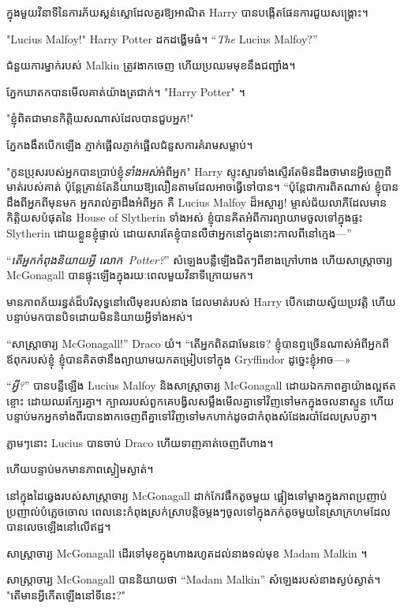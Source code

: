 ក្នុងមួយវិនាទីនៃការភ័យស្លន់ស្លោដែលគួរឱ្យអាណិត Harry បានបង្កើតផែនការជួយសង្គ្រោះ។

"Lucius Malfoy!" Harry Potter ដកដង្ហើមធំ។ “\emph{The} Lucius Malfoy?”

ជំនួយការម្នាក់របស់ Malkin ត្រូវងាកចេញ ហើយប្រឈមមុខនឹងជញ្ជាំង។

ភ្នែកឃាតកបានមើលគាត់យ៉ាងត្រជាក់។ "Harry Potter" ។

"ខ្ញុំពិតជាមានកិត្តិយសណាស់ដែលបានជួបអ្នក!"

ភ្នែក​ងងឹត​បើក​ឡើង ភ្ញាក់ផ្អើល​ភ្ញាក់ផ្អើល​ជំនួស​ការ​គំរាម​សម្លាប់។

"កូនប្រុសរបស់អ្នកបានប្រាប់ខ្ញុំ\emph{ទាំងអស់}អំពីអ្នក" Harry ស្ទុះស្ទារទាំងស្ទើរតែមិនដឹងថាមានអ្វីចេញពីមាត់របស់គាត់ ប៉ុន្តែគ្រាន់តែនិយាយឱ្យលឿនតាមដែលអាចធ្វើទៅបាន។ “ប៉ុន្តែជាការពិតណាស់ ខ្ញុំបានដឹងពីអ្នកពីមុនមក អ្នករាល់គ្នាដឹងអំពីអ្នក គឺ Lucius Malfoy ដ៏អស្ចារ្យ! ម្ចាស់ជ័យលាភីដែលមានកិត្តិយសបំផុតនៃ House of Slytherin ទាំងអស់ ខ្ញុំបានគិតអំពីការព្យាយាមចូលទៅក្នុងផ្ទះ Slytherin ដោយខ្លួនខ្ញុំផ្ទាល់ ដោយសារតែខ្ញុំបានលឺថាអ្នកនៅក្នុងនោះកាលពីនៅក្មេង—”

“\emph{តើអ្នកកំពុងនិយាយអ្វី លោក~Potter?}” សំឡេងបន្លឺឡើងជិតៗពីខាងក្រៅហាង ហើយសាស្រ្តាចារ្យ McGonagall បានផ្ទុះឡើងក្នុងរយៈពេលមួយវិនាទីក្រោយមក។

មានភាពភ័យរន្ធត់ដ៏បរិសុទ្ធនៅលើមុខរបស់នាង ដែលមាត់របស់ Harry បើកដោយស្វ័យប្រវត្តិ ហើយបន្ទាប់មកបានបិទដោយមិននិយាយអ្វីទាំងអស់។

“សាស្រ្តាចារ្យ McGonagall!” Draco យំ។ “តើអ្នកពិតជាមែនទេ? ខ្ញុំ​បាន​ឮ​ច្រើន​ណាស់​អំពី​អ្នក​ពី​ឪពុក​របស់​ខ្ញុំ ខ្ញុំ​បាន​គិត​ថា​នឹង​ព្យាយាម​យក​តម្រៀប​ទៅ​ក្នុង Gryffindor ដូច្នេះ​ខ្ញុំ​អាច—»

“\emph{អ្វី?}” បានបន្លឺឡើង Lucius Malfoy និងសាស្រ្តាចារ្យ McGonagall ដោយឯកភាពគ្នាយ៉ាងល្អឥតខ្ចោះ ដោយឈរក្បែរគ្នា។ ក្បាលរបស់ពួកគេបង្វិលសម្លឹងមើលគ្នាទៅវិញទៅមកក្នុងចលនាស្ទួន ហើយបន្ទាប់មកអ្នកទាំងពីរបានងាកចេញពីគ្នាទៅវិញទៅមកហាក់ដូចជាកំពុងសំដែងរបាំដែលស្របគ្នា។

ភ្លាមៗនោះ Lucius បានចាប់ Draco ហើយទាញគាត់ចេញពីហាង។

ហើយបន្ទាប់មកមានភាពស្ងៀមស្ងាត់។

នៅក្នុងដៃឆ្វេងរបស់សាស្រ្តាចារ្យ McGonagall ដាក់កែវផឹកតូចមួយ ផ្អៀងទៅម្ខាងក្នុងភាពប្រញាប់ប្រញាល់បំភ្លេចចោល ពេលនេះកំពុងស្រក់ស្រាបន្តិចម្តងៗចូលទៅក្នុងភក់តូចមួយនៃស្រាក្រហមដែលបានលេចឡើងនៅលើឥដ្ឋ។

សាស្រ្តាចារ្យ McGonagall ដើរទៅមុខក្នុងហាងរហូតដល់នាងទល់មុខ Madam Malkin ។

សាស្ត្រាចារ្យ McGonagall បាននិយាយថា “Madam Malkin” សំឡេងរបស់នាងស្ងប់ស្ងាត់។ "តើមានអ្វីកើតឡើងនៅទីនេះ?"

